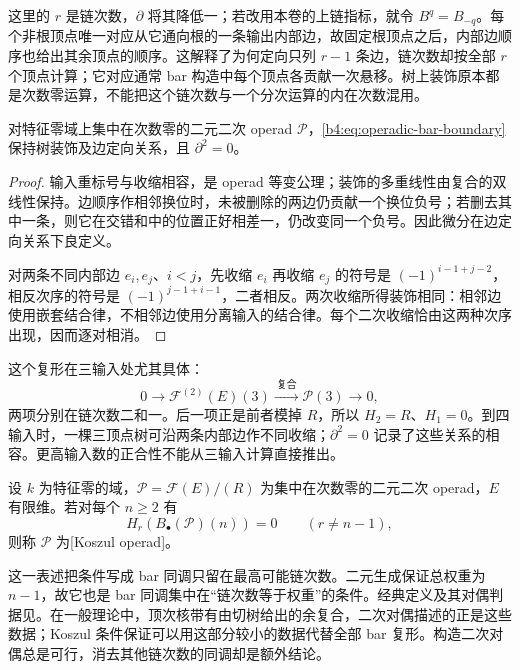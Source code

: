 这里的 \(r\) 是链次数，\(\partial\) 将其降低一；若改用本卷的上链指标，就令 \(B^q=B_{-q}\)。每个非根顶点唯一对应从它通向根的一条输出内部边，故固定根顶点之后，内部边顺序也给出其余顶点的顺序。这解释了为何定向只列 \(r-1\) 条边，链次数却按全部 \(r\) 个顶点计算；它对应通常 bar 构造中每个顶点各贡献一次悬移。树上装饰原本都是次数零运算，不能把这个链次数与一个分次运算的内在次数混用。

\begin{proposition}\label{b4:prop:operadic-bar-square-zero}
	对特征零域上集中在次数零的二元二次 operad \(\mathcal P\)，\eqref{b4:eq:operadic-bar-boundary}保持树装饰及边定向关系，且 \(\partial^2=0\)。
\end{proposition}
\begin{proof}
	输入重标号与收缩相容，是 operad 等变公理；装饰的多重线性由复合的双线性保持。边顺序作相邻换位时，未被删除的两边仍贡献一个换位负号；若删去其中一条，则它在交错和中的位置正好相差一，仍改变同一个负号。因此微分在边定向关系下良定义。

	对两条不同内部边 \(e_i,e_j\)、\(i<j\)，先收缩 \(e_i\) 再收缩 \(e_j\) 的符号是 \((-1)^{i-1+j-2}\)，相反次序的符号是 \((-1)^{j-1+i-1}\)，二者相反。两次收缩所得装饰相同：相邻边使用嵌套结合律，不相邻边使用分离输入的结合律。每个二次收缩恰由这两种次序出现，因而逐对相消。
\end{proof}

这个复形在三输入处尤其具体：
\[
	0\longrightarrow\mathcal F^{(2)}(E)(3)
	\xrightarrow{\ \text{复合}\ }\mathcal P(3)\longrightarrow0,
\]
两项分别在链次数二和一。后一项正是前者模掉 \(R\)，所以 \(H_2=R\)、\(H_1=0\)。到四输入时，一棵三顶点树可沿两条内部边作不同收缩；\(\partial^2=0\) 记录了这些关系的相容。更高输入数的正合性不能从三输入计算直接推出。

\begin{definition}\label{b4:def:koszul-operad}
	设 \(k\) 为特征零的域，\(\mathcal P=\mathcal F(E)/(R)\) 为集中在次数零的二元二次 operad，\(E\) 有限维。若对每个 \(n\ge2\) 有
	\[
		H_r(B_\bullet(\mathcal P)(n))=0\qquad(r\ne n-1),
	\]
	则称 \(\mathcal P\) 为[Koszul operad]。
\end{definition}

这一表述把条件写成 bar 同调只留在最高可能链次数。二元生成保证总权重为 \(n-1\)，故它也是 bar 同调集中在“链次数等于权重”的条件。经典定义及其对偶判据见\cite[Section 4.1]{GinzburgKapranov1994KoszulOperads}。在一般理论中，顶次核带有由切树给出的余复合，二次对偶描述的正是这些数据；Koszul 条件保证可以用这部分较小的数据代替全部 bar 复形。构造二次对偶总是可行，消去其他链次数的同调却是额外结论。

